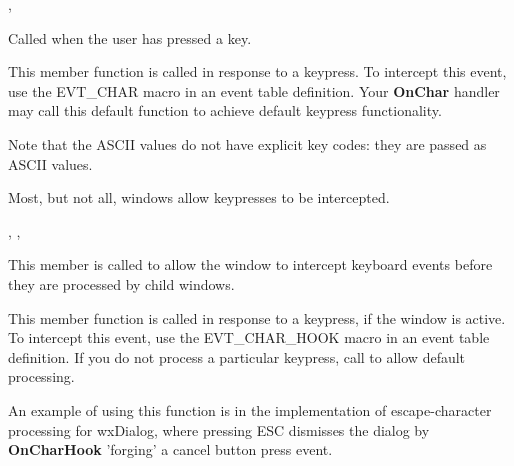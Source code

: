
,\rtfsp
{}

\label{wxwindowonchar}


Called when the user has pressed a key.




This member function is called in response to a keypress. To intercept this event,
use the EVT\_CHAR macro in an event table definition. Your {\bf OnChar} handler may call this
default function to achieve default keypress functionality.

Note that the ASCII values do not have explicit key codes: they are passed as ASCII
values.

Most, but not all, windows allow keypresses to be intercepted.


, ,\rtfsp
{}

\label{wxwindowoncharhook}


This member is called to allow the window to intercept keyboard events
before they are processed by child windows.




This member function is called in response to a keypress, if the window is active. To intercept this event,
use the EVT\_CHAR\_HOOK macro in an event table definition. If you do not process a particular
keypress, call  to allow default processing.

An example of using this function is in the implementation of escape-character processing for wxDialog,
where pressing ESC dismisses the dialog by {\bf OnCharHook} 'forging' a cancel button press event.

